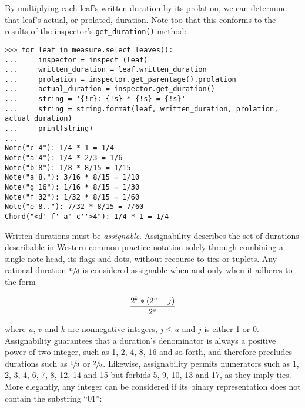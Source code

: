 \noindent By multiplying each leaf's written duration by its prolation, we can
determine that leaf's actual, or prolated, duration. Note too that this
conforms to the results of the inspector's \texttt{get\_duration()} method:

\begin{comment}
<abjad>
for leaf in measure.select_leaves():
    inspector = inspect_(leaf)
    written_duration = leaf.written_duration
    prolation = inspector.get_parentage().prolation
    actual_duration = inspector.get_duration()
    string = '{!r}: {!s} * {!s} = {!s}'
    string = string.format(leaf, written_duration, prolation, actual_duration)
    print(string)

</abjad>
\end{comment}

\begin{abjadbookoutput}
\begin{singlespacing}
\vspace{-0.5\baselineskip}
\begin{lstlisting}
>>> for leaf in measure.select_leaves():
...     inspector = inspect_(leaf)
...     written_duration = leaf.written_duration
...     prolation = inspector.get_parentage().prolation
...     actual_duration = inspector.get_duration()
...     string = '{!r}: {!s} * {!s} = {!s}'
...     string = string.format(leaf, written_duration, prolation, actual_duration)
...     print(string)
...
Note("c'4"): 1/4 * 1 = 1/4
Note("a'4"): 1/4 * 2/3 = 1/6
Note("b'8"): 1/8 * 8/15 = 1/15
Note("a'8."): 3/16 * 8/15 = 1/10
Note("g'16"): 1/16 * 8/15 = 1/30
Note("f'32"): 1/32 * 8/15 = 1/60
Note("e'8.."): 7/32 * 8/15 = 7/60
Chord("<d' f' a' c''>4"): 1/4 * 1 = 1/4
\end{lstlisting}
\end{singlespacing}
\end{abjadbookoutput}

\noindent Written durations must be \emph{assignable}. Assignability describes
the set of durations describable in Western common practice notation solely
through combining a single note head, its flags and dots, without recourse to
ties or tuplets. Any rational duration $\sfrac{n}{d}$ is considered assignable
when and only when it adheres to the form

\begin{equation}
{ 2^k * (2^u - j) \over 2^v }
\end{equation}

\noindent where $u$, $v$ and $k$ are nonnegative integers, $j \leq u$ and $j$
is either 1 or 0. Assignability guarantees that a duration's denominator is
always a positive power-of-two integer, such as 1, 2, 4, 8, 16 and so forth,
and therefore precludes durations such as $\sfrac{1}{3}$ or $\sfrac{2}{5}$.
Likewise, assignability permits numerators such as 1, 2, 3, 4, 6, 7, 8, 12, 14
and 15 but forbids 5, 9, 10, 13 and 17, as they imply ties. More elegantly, any
integer can be considered if its binary representation does not contain the
substring \enquote{01}:

